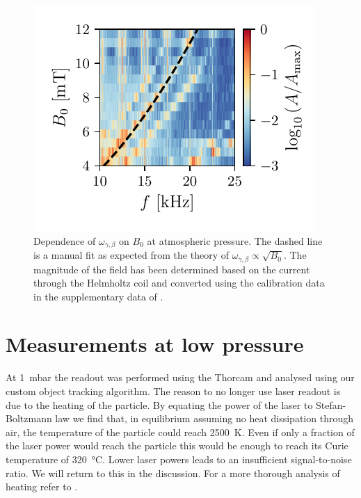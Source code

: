 \begin{figure}
    \includegraphics{figures/data/librational_mode_dependence_on_B0.pdf}
    \caption{Dependence of $\omega_{\gamma,\beta}$ on $B_0$ at atmospheric pressure. The dashed line is a manual fit as expected from the theory of $\omega_{\gamma,\beta} \propto \sqrt{B_0}$. The magnitude of the field has been determined based on the current through the Helmholtz coil and converted using the calibration data in the supplementary data of \textcite{janse_characterization_2024}.}
    \label{fig:librational-mode-dependence-magnetic-field-1bar}
\end{figure}

\section{Measurements at low pressure}
\label{sec:measurements-at-low-pressure}
At \qty{1}{\milli\bar} the readout was performed using the Thorcam and analysed using our custom object tracking algorithm. The reason to no longer use laser readout is due to the heating of the particle. By equating the power of the laser to Stefan-Boltzmann law we find that, in equilibrium assuming no heat dissipation through air, the temperature of the particle could reach \qty{2500}{\kelvin}. Even if only a fraction of the laser power would reach the particle this would be enough to reach its Curie temperature of \qty{320}{\celsius}\cite{magnequench}. Lower laser powers leads to an insufficient signal-to-noise ratio. We will return to this in the discussion. For a more thorough analysis of heating refer to \cite{millen}.

